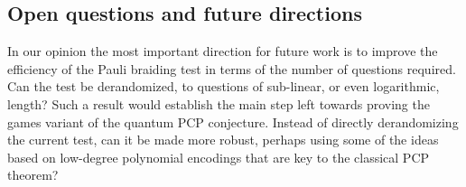 \documentclass[11pt,letterpaper]{article}
\newcommand{\<}{\langle}
\renewcommand{\>}{\rangle}
\begin{document}
\subsection{Open questions and future directions}
\label{sec:open}

In our opinion the most important direction for future work is to improve the efficiency of the Pauli braiding test in terms of the number of questions required. Can the test be derandomized, to questions of sub-linear, or even logarithmic, length? Such a result would establish the main step left towards proving the games variant of the quantum PCP conjecture. Instead of directly derandomizing the current test, can it be made more robust, perhaps using some of the ideas based on low-degree polynomial encodings that are key to the classical PCP theorem? 
\end{document}
